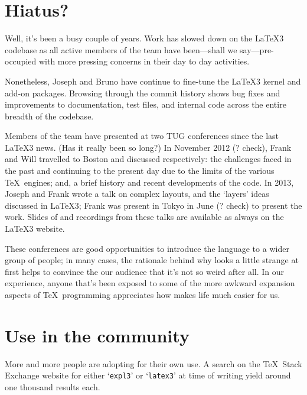 \documentclass{ltnews}
\begin{document}
\maketitle

\raisefirstsection
\section{Hiatus?}

Well, it's been a busy couple of years.
Work has slowed down on the LaTeX3 codebase as all active members of the team have been---shall we say---pre-occupied with more pressing concerns in their day to day activities.

Nonetheless, Joseph and Bruno have continue to fine-tune the LaTeX3 kernel and add-on packages.
Browsing through the commit history shows bug fixes and improvements to documentation, test files, and internal code across the entire breadth of the codebase.

Members of the team have presented at two TUG conferences since the last LaTeX3 news. (Has it really been so long?)
In November 2012 (? check), Frank and Will travelled to Boston and discussed respectively: the challenges faced in the past and continuing to the present day due to the limits of the various \TeX\ engines; and, a brief history and recent developments of the  code.
In 2013, Joseph and Frank wrote a talk on complex layouts, and the `layers' ideas discussed in LaTeX3; Frank was present in Tokyo in June (? check) to present the work.
Slides of and recordings from these talks are available as always on the \LaTeX3 website.

These conferences are good opportunities to introduce the  language to a wider group of people; in many cases, the rationale behind why  looks a little strange at first helps to convince the our audience that it's not so weird after all.
In our experience, anyone that's been exposed to some of the more awkward expansion aspects of \TeX\ programming appreciates how  makes life much easier for us.

\section{Use in the community}

More and more people are adopting  for their own use.
A search on the \TeX\ Stack Exchange website for either `\texttt{expl3}' or `\texttt{latex3}' at time of writing yield around one thousand results each.
\end{document}
